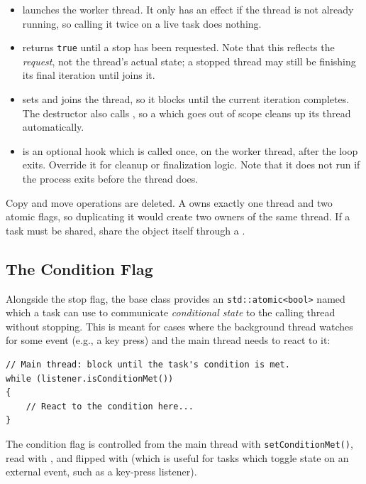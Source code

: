 \begin{itemize}\itemsep0em
	\item {} launches the worker thread. It only has an effect if the thread is not already running, so calling it twice on a live task does nothing.
	\item {} returns \texttt{true} until a stop has been requested. Note that this reflects the \textit{request}, not the thread's actual state; a stopped thread may still be finishing its final  iteration until  joins it.
	\item {} sets  and joins the thread, so it blocks until the current  iteration completes. The destructor also calls , so a  which goes out of scope cleans up its thread automatically.
	\item {} is an optional hook which is called once, on the worker thread, after the loop exits. Override it for cleanup or finalization logic. Note that it does not run if the process exits before the thread does.
\end{itemize}
Copy and move operations are deleted. A  owns exactly one thread and two atomic flags, so duplicating it would create two owners of the same thread. If a task must be shared, share the object itself through a .

\subsection{The Condition Flag}

Alongside the stop flag, the base class provides an \texttt{std::atomic<bool>} named  which a task can use to communicate \textit{conditional state} to the calling thread without stopping. This is meant for cases where the background thread watches for some event (e.g., a key press) and the main thread needs to react to it:
\begin{lstlisting}[style=cppstyle]
// Main thread: block until the task's condition is met.
while (listener.isConditionMet())
{
    // React to the condition here...
}
\end{lstlisting}
The condition flag is controlled from the main thread with \texttt{setConditionMet()}, read with , and flipped with  (which is useful for tasks which toggle state on an external event, such as a key-press listener).

